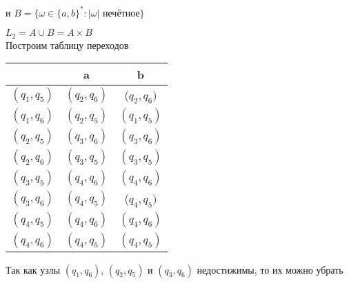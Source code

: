 \documentclass{article}
\begin{document}
\begin{enumerate}
     и 
     \(B=\{\omega\in\{a,b\}^* : |\omega| \text{ нечётное} \} \)
    \begin{center}
            \begin{figure}[htbp]
                \centering
                
            \end{figure}
        \end{center}
    \(L_2 = A \cup B = A \times B \)    \\
    Построим таблицу переходов
    \begin{center}
        \begin{tabular} {|c|c|c|}
            \hline
             & a & b \\
            \hline
            \((q_1,q_5)\) & \((q_2,q_6)\) & (\(q_2,q_6)\) \\
            \hline
            \((q_1,q_6)\) & \((q_2,q_5)\) & \((q_1,q_5)\) \\
            \hline
            \((q_2,q_5)\) & \((q_3,q_6)\) & \((q_3,q_6)\) \\
            \hline
            \((q_2,q_6)\) & \((q_3,q_5)\) & \((q_3,q_5)\) \\
            \hline
            \((q_3,q_5)\) & \((q_4,q_6)\) & \((q_4,q_6)\) \\
            \hline
            \((q_3,q_6)\) & \((q_4,q_5)\) & (\(q_4,q_5)\) \\
            \hline
            \((q_4,q_5)\) & \((q_4,q_6)\) & \((q_4,q_6)\) \\
            \hline
            \((q_4,q_6)\) &  \((q_4,q_5)\) & \((q_4,q_5)\) \\
            \hline
        \end{tabular}
    \end{center}
    \begin{center}
            \begin{figure}[htbp]
                \centering
                
            \end{figure}
        \end{center}
    \newpage 
    Так как узлы \((q_1,q_6)\), \((q_2,q_5)\) и \((q_3,q_6)\) недостижимы, то их можно убрать
    \begin{center}
            \begin{figure}[htbp]
                \centering
                
            \end{figure}
        \end{center}

\end{enumerate}
\end{document}
